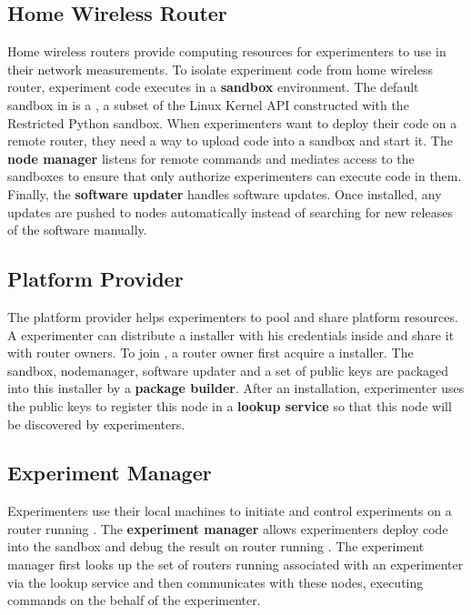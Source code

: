 \subsection{Home Wireless Router}
Home wireless routers provide computing resources for experimenters to use in their network measurements. To isolate experiment code from home wireless router, experiment code executes in a \textbf{sandbox} environment. The default sandbox in \sysname is a \sandboxname, a subset of the Linux Kernel API constructed with the Restricted Python sandbox. When experimenters want to deploy their code on a remote router, they need a way to upload code into a sandbox and start it. The \textbf{node manager} listens for remote commands and mediates access to the sandboxes to ensure that only authorize experimenters can execute code in them. Finally, the \textbf{software updater} handles software updates. Once installed, any updates are pushed to nodes automatically instead of searching for new releases of the software manually.  

\subsection{Platform Provider}
The platform provider helps experimenters to pool and share platform resources. A experimenter can distribute a \sysname installer with his credentials inside and share it with router owners. To join \sysname, a router owner first acquire a \sysname installer. The sandbox, nodemanager, software updater and a set of public keys are packaged into this installer by a \textbf{package builder}. After an installation, experimenter uses the public keys to register this node in a \textbf{lookup service} so that this node will be discovered by experimenters.

\subsection{Experiment Manager}
Experimenters use their local machines to initiate and control experiments on a router running \sysname. The \textbf{experiment manager} allows experimenters deploy code into the sandbox and debug the result on router running \sysname. The experiment manager first looks up the set of routers running \sysname associated with an experimenter via the lookup service and then communicates with these nodes, executing commands on the behalf of the experimenter.  


